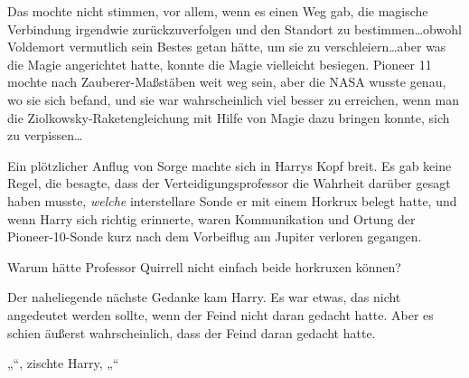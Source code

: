 Das mochte nicht stimmen, vor allem, wenn es einen Weg gab, die magische Verbindung irgendwie zurückzuverfolgen und den Standort zu bestimmen…obwohl Voldemort vermutlich sein Bestes getan hätte, um sie zu verschleiern…aber was die Magie angerichtet hatte, konnte die Magie vielleicht besiegen. Pioneer 11 mochte nach Zauberer-Maßstäben weit weg sein, aber die NASA wusste genau, wo sie sich befand, und sie war wahrscheinlich viel besser zu erreichen, wenn man die Ziolkowsky-Raketengleichung mit Hilfe von Magie dazu bringen konnte, sich zu verpissen…

Ein plötzlicher Anflug von Sorge machte sich in Harrys Kopf breit. Es gab keine Regel, die besagte, dass der Verteidigungsprofessor die Wahrheit darüber gesagt haben musste, \emph{welche} interstellare Sonde er mit einem Horkrux belegt hatte, und wenn Harry sich richtig erinnerte, waren Kommunikation und Ortung der Pioneer-10-Sonde kurz nach dem Vorbeiflug am Jupiter verloren gegangen.

Warum hätte Professor Quirrell nicht einfach beide horkruxen können?

Der naheliegende nächste Gedanke kam Harry. Es war etwas, das nicht angedeutet werden sollte, wenn der Feind nicht daran gedacht hatte. Aber es schien äußerst wahrscheinlich, dass der Feind daran gedacht hatte.

„“, zischte Harry, „“

